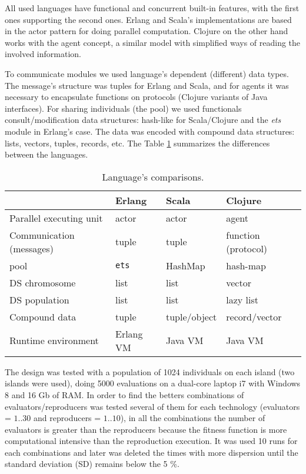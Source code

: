 
All used languages have functional and concurrent built-in features, with the first ones supporting the second ones. Erlang and Scala’s implementations are based in the actor pattern for doing parallel computation. Clojure on the other hand works with the agent concept, a similar model with simplified ways of reading the involved information.

To communicate modules we used language’s dependent (different) data types. The message's structure was tuples for Erlang and Scala, and for agents it was necessary to encapsulate functions on protocols (Clojure variants of Java interfaces). For sharing individuals (the pool) we used functionals consult/modification data structures: hash-like for Scala/Clojure and the {\em ets} module in Erlang’s case. The data was encoded with compound data structures: lists, vectors, tuples, records, etc. The Table \ref{tb:res:comp} summarizes the differences between the languages.

\begin{table}
  \caption{Language's comparisons.}\label{tb:res:comp}
  \centering
  \begin{tabular}{|p{4cm}|>{\centering}p{3cm}|>{\centering}p{3cm}|>{\centering}p{3cm}|}
    \hline
     & \textbf{Erlang} & \textbf{Scala} & \textbf{Clojure} \tabularnewline
    \hline
    Parallel executing unit & actor & actor & agent \tabularnewline
    \hline
    Communication (messages) & tuple & tuple & function (protocol) \tabularnewline
    \hline
    pool & \texttt{ets} & HashMap & hash-map \tabularnewline
    \hline
    DS chromosome & list & list & vector \tabularnewline
    \hline
    DS population & list & list & lazy list \tabularnewline
    \hline
    Compound data & tuple & tuple/object & record/vector \tabularnewline
    \hline
    Runtime environment & Erlang VM & Java VM & Java VM \tabularnewline
    \hline
  \end{tabular}

\end{table}



The design was tested with a population of 1024 individuals on each
island (two islands were used), doing 5000 evaluations on a dual-core
laptop  i7 with Windows 8 and 16 Gb of RAM. In order to find the
betters combinations of evaluators/reproducers was tested several of
them for each technology (evaluators = $1..30$ and reproducers =
$1..10$), in all the combinations the number of evaluators is greater
than the reproducers because the fitness function is more
computational intensive than the reproduction execution. It was used
10 runs for each combinations and later was deleted the times with
more dispersion until the standard deviation (SD) remains below the 5
\%. 


